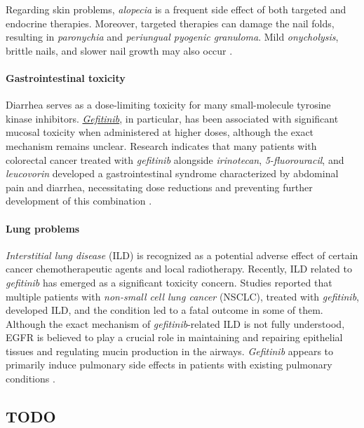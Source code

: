 Regarding skin problems, \textit{alopecia} is a frequent side effect of both targeted and endocrine therapies. Moreover, targeted therapies can damage the nail folds, resulting in \textit{paronychia} and \textit{periungual pyogenic granuloma}. Mild \textit{onycholysis}, brittle nails, and slower nail growth may also occur \cite{skin_nails}.

\paragraph{Gastrointestinal toxicity}

Diarrhea serves as a dose-limiting toxicity for many small-molecule tyrosine kinase inhibitors. \href{https://en.wikipedia.org/wiki/Gefitinib}{\textit{Gefitinib}}, in particular, has been associated with significant mucosal toxicity when administered at higher doses, although the exact mechanism remains unclear. Research indicates that many patients with colorectal cancer treated with \textit{gefitinib} alongside \textit{irinotecan}, \textit{5-fluorouracil}, and \textit{leucovorin} developed a gastrointestinal syndrome characterized by abdominal pain and diarrhea, necessitating dose reductions and preventing further development of this combination \cite{se_tt}.

\paragraph{Lung problems}

\textit{Interstitial lung disease} (ILD) is recognized as a potential adverse effect of certain cancer chemotherapeutic agents and local radiotherapy. Recently, ILD related to \textit{gefitinib} has emerged as a significant toxicity concern. Studies reported that multiple patients with \textit{non-small cell lung cancer} (NSCLC), treated with \textit{gefitinib}, developed ILD, and the condition led to a fatal outcome in some of them. Although the exact mechanism of \textit{gefitinib}-related ILD is not fully understood, EGFR is believed to play a crucial role in maintaining and repairing epithelial tissues and regulating mucin production in the airways. \textit{Gefitinib} appears to primarily induce pulmonary side effects in patients with existing pulmonary conditions \cite{se_tt}.

\subsection{TODO} 

\cleardoublepage
